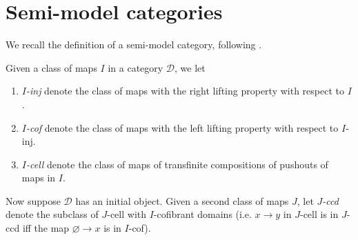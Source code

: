 \documentclass[a4paper,10pt
,draft
]{article}%
\renewcommand{\1}{\eta}%
\begin{document}
\section{Semi-model categories}

We recall the definition of a semi-model category, following \cite{Spi01,Wh16}.

\begin{definition}
      Given a class of maps $ I$ in a category $\mathcal D$, we let
      \begin{enumerate}[label = (\roman*)]
      \item \textit{$ I$-inj} denote the class of maps with the right lifting property with respect to $ I$.
      \item \textit{$ I$-cof} denote the class of maps with the left lifting property with respect to $ I$-inj.
      \item \textit{$ I$-cell} denote the class of maps of transfinite compositions of pushouts of maps in $ I$.
      \end{enumerate}

      Now suppose $\mathcal D$ has an initial object.
      Given a second class of maps $ J$, let \textit{$ J$-ccd} denote
      the subclass of $ J$-cell with $ I$-cofibrant domains
      (i.e. $x \to y$ in $ J$-cell is in $ J$-ccd iff the map $\varnothing \to x$ is in $ I$-cof).
\end{definition}
\end{document}
